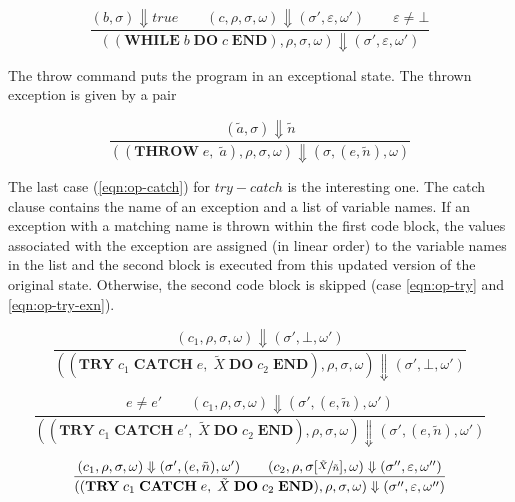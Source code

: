 \begin{equation}\label{eqn:op-while-exn}
\frac{(b, \sigma) \Downarrow true \qquad (c, \rho, \sigma, \omega) \Downarrow (\sigma', \varepsilon, \omega') \qquad \varepsilon \neq \bot}{((\textbf{WHILE}\; b\; \textbf{DO}\; c\; \textbf{END}), \rho, \sigma, \omega) \Downarrow (\sigma', \varepsilon, \omega')}
\end{equation}

The throw command puts the program in an exceptional state. The thrown exception is given by a pair

\begin{equation}\label{eqn:op-throw}
\frac{(\tilde{a}, \sigma) \Downarrow \tilde{n}}{((\textbf{THROW}\; e,\; \tilde{a}), \rho, \sigma, \omega) \Downarrow (\sigma, (e, \tilde{n}), \omega)}
\end{equation}

The last case (\ref{eqn:op-catch}) for $try-catch$ is the interesting one. The catch clause contains the name of an exception and a list of variable names. If an exception with a matching name is thrown within the first code block, the values associated with the exception are assigned (in linear order) to the variable names in the list and the second block is executed from this updated version of the original state. Otherwise, the second code block is skipped (case \ref{eqn:op-try} and \ref{eqn:op-try-exn}).

\begin{equation}\label{eqn:op-try}
\frac{(c_1, \rho, \sigma, \omega) \Downarrow (\sigma', \bot, \omega')}{((\textbf{TRY}\; c_1\; \textbf{CATCH}\; e,\; \tilde{X}\; \textbf{DO}\; c_2\; \textbf{END}), \rho, \sigma, \omega) \Downarrow (\sigma', \bot, \omega')}
\end{equation}

\begin{equation}\label{eqn:op-try-exn}
\frac{e \neq e' \qquad (c_1, \rho, \sigma, \omega) \Downarrow (\sigma', (e, \tilde{n}), \omega')}{((\textbf{TRY}\; c_1\; \textbf{CATCH}\; e',\; \tilde{X}\; \textbf{DO}\; c_2\; \textbf{END}), \rho, \sigma, \omega) \Downarrow (\sigma', (e, \tilde{n}), \omega')}
\end{equation}

\begin{equation}\label{eqn:op-catch}
\frac{(c_1, \rho, \sigma, \omega) \Downarrow (\sigma', (e, \tilde{n}), \omega') \qquad (c_2, \rho, \sigma[\sfrac{\tilde{X}}{\tilde{n}}], \omega) \Downarrow (\sigma'', \varepsilon, \omega'')}{((\textbf{TRY}\; c_1\; \textbf{CATCH}\; e,\; \tilde{X}\; \textbf{DO}\; c_2\; \textbf{END}), \rho, \sigma, \omega) \Downarrow (\sigma'', \varepsilon, \omega'')}
\end{equation}

